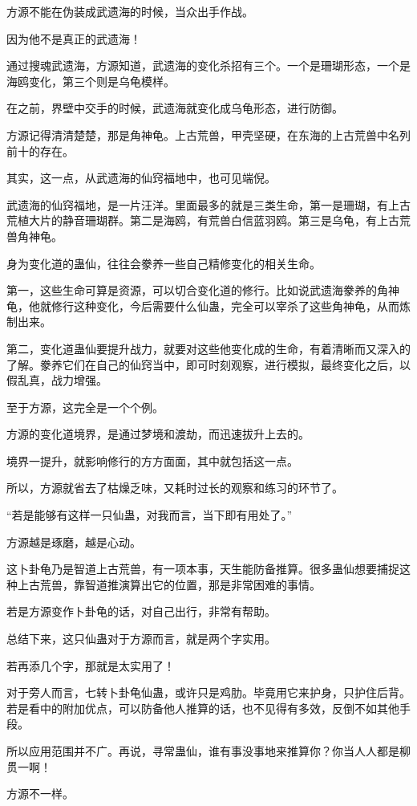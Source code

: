 \begin{this_body}
方源不能在伪装成武遗海的时候，当众出手作战。

因为他不是真正的武遗海！

通过搜魂武遗海，方源知道，武遗海的变化杀招有三个。一个是珊瑚形态，一个是海鸥变化，第三个则是乌龟模样。

在之前，界壁中交手的时候，武遗海就变化成乌龟形态，进行防御。

方源记得清清楚楚，那是角神龟。上古荒兽，甲壳坚硬，在东海的上古荒兽中名列前十的存在。

其实，这一点，从武遗海的仙窍福地中，也可见端倪。

武遗海的仙窍福地，是一片汪洋。里面最多的就是三类生命，第一是珊瑚，有上古荒植大片的静音珊瑚群。第二是海鸥，有荒兽白信蓝羽鸥。第三是乌龟，有上古荒兽角神龟。

身为变化道的蛊仙，往往会豢养一些自己精修变化的相关生命。

第一，这些生命可算是资源，可以切合变化道的修行。比如说武遗海豢养的角神龟，他就修行这种变化，今后需要什么仙蛊，完全可以宰杀了这些角神龟，从而炼制出来。

第二，变化道蛊仙要提升战力，就要对这些他变化成的生命，有着清晰而又深入的了解。豢养它们在自己的仙窍当中，即可时刻观察，进行模拟，最终变化之后，以假乱真，战力增强。

至于方源，这完全是一个个例。

方源的变化道境界，是通过梦境和渡劫，而迅速拔升上去的。

境界一提升，就影响修行的方方面面，其中就包括这一点。

所以，方源就省去了枯燥乏味，又耗时过长的观察和练习的环节了。

“若是能够有这样一只仙蛊，对我而言，当下即有用处了。”

方源越是琢磨，越是心动。

这卜卦龟乃是智道上古荒兽，有一项本事，天生能防备推算。很多蛊仙想要捕捉这种上古荒兽，靠智道推演算出它的位置，那是非常困难的事情。

若是方源变作卜卦龟的话，对自己出行，非常有帮助。

总结下来，这只仙蛊对于方源而言，就是两个字实用。

若再添几个字，那就是太实用了！

对于旁人而言，七转卜卦龟仙蛊，或许只是鸡肋。毕竟用它来护身，只护住后背。若是看中的附加优点，可以防备他人推算的话，也不见得有多效，反倒不如其他手段。

所以应用范围并不广。再说，寻常蛊仙，谁有事没事地来推算你？你当人人都是柳贯一啊！

方源不一样。


\end{this_body}
